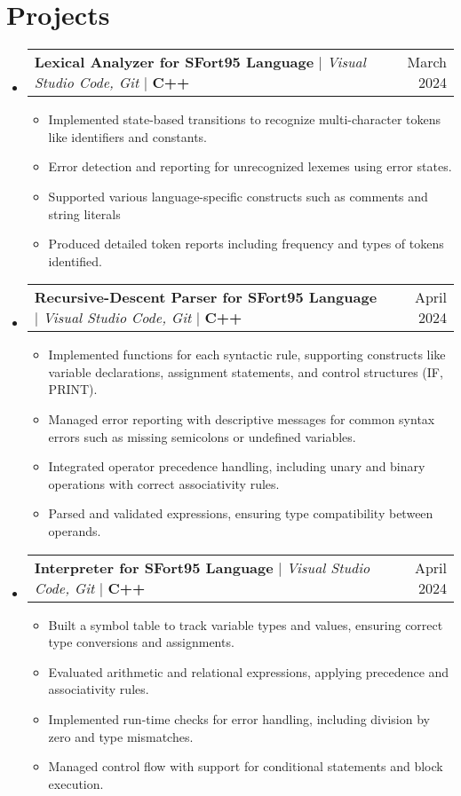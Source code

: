 \documentclass[letterpaper,11pt]{article}
\makeatletter
\newcommand{\resumeItem}[1]{
  \item\small{
    {#1 \vspace{-2pt}}
  }
}
\newcommand{\resumeProjectHeading}[2]{
    \item
    \begin{tabular*}{0.97\textwidth}{l@{\extracolsep{\fill}}r}
      \small#1 & #2 \\
    \end{tabular*}\vspace{-7pt}
}
\newcommand{\resumeSubHeadingListStart}{\begin{itemize}[leftmargin=0.15in, label={}]}
\newcommand{\resumeSubHeadingListEnd}{\end{itemize}}
\newcommand{\resumeItemListStart}{\begin{itemize}}
\newcommand{\resumeItemListEnd}{\end{itemize}\vspace{-5pt}}
\makeatother
\begin{document}
\section{Projects}
    \resumeSubHeadingListStart
      \resumeProjectHeading
          {\textbf{Lexical Analyzer for SFort95 Language} $|$ \emph{Visual Studio Code, Git} $|$ \textbf{C++}} {March 2024}
          \resumeItemListStart
            \resumeItem{Implemented state-based transitions to recognize multi-character tokens like identifiers and constants.}
            \resumeItem{Error detection and reporting for unrecognized lexemes using error states.}
            \resumeItem{Supported various language-specific constructs such as comments and string literals}
            \resumeItem{Produced detailed token reports including frequency and types of tokens identified.}
          \resumeItemListEnd
      \resumeProjectHeading
          {\textbf{Recursive-Descent Parser for SFort95 Language} $|$ \emph{Visual Studio Code, Git} $|$ \textbf{C++}}{April 2024}
          \resumeItemListStart
            \resumeItem{Implemented functions for each syntactic rule, supporting constructs like variable declarations, assignment statements, and control structures (IF, PRINT).}
            \resumeItem{Managed error reporting with descriptive messages for common syntax errors such as missing semicolons or undefined variables.}
            \resumeItem{Integrated operator precedence handling, including unary and binary operations with correct associativity rules.}
            \resumeItem{Parsed and validated expressions, ensuring type compatibility between operands.}
          \resumeItemListEnd
          \resumeProjectHeading
          {\textbf{Interpreter for SFort95 Language} $|$ \emph{Visual Studio Code, Git} $|$ \textbf{C++}}{April 2024}
          \resumeItemListStart
            \resumeItem{Built a symbol table to track variable types and values, ensuring correct type conversions and assignments.}
            \resumeItem{Evaluated arithmetic and relational expressions, applying precedence and associativity rules.}
            \resumeItem{Implemented run-time checks for error handling, including division by zero and type mismatches.}
            \resumeItem{Managed control flow with support for conditional statements and block execution.}
          \resumeItemListEnd
    \resumeSubHeadingListEnd



%
\end{document}
